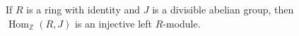If $R$ is a ring with identity and $J$ is a divisible abelian group, then $\operatorname{Hom}_{\mathbb{Z}}(R,J)$ is an injective left $R$-module.
